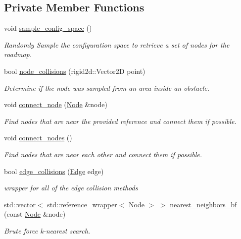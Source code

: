 \subsection*{Private Member Functions}
\begin{DoxyCompactItemize}
\item 
\mbox{\label{classprm_1_1RoadMap_a0d91fcf77606b05494dfcae4a4945351}} 
void \hyperlink{classprm_1_1RoadMap_a0d91fcf77606b05494dfcae4a4945351}{sample\+\_\+config\+\_\+space} ()
\begin{DoxyCompactList}\small\item\em Randomly Sample the configuration space to retrieve a set of nodes for the roadmap. \end{DoxyCompactList}\item 
bool \hyperlink{classprm_1_1RoadMap_a73c24a16d78040b0d5f247f0cf181363}{node\+\_\+collisions} (rigid2d\+::\+Vector2D point)
\begin{DoxyCompactList}\small\item\em Determine if the node was sampled from an area inside an obstacle. \end{DoxyCompactList}\item 
void \hyperlink{classprm_1_1RoadMap_ad74dcd92a949ee573310790fa8b2cae1}{connect\+\_\+node} (\hyperlink{structprm_1_1Node}{Node} \&node)
\begin{DoxyCompactList}\small\item\em Find nodes that are near the provided reference and connect them if possible. \end{DoxyCompactList}\item 
\mbox{\label{classprm_1_1RoadMap_a05eba7fbe20463c8b8a3463dfd141c30}} 
void \hyperlink{classprm_1_1RoadMap_a05eba7fbe20463c8b8a3463dfd141c30}{connect\+\_\+nodes} ()
\begin{DoxyCompactList}\small\item\em Find nodes that are near each other and connect them if possible. \end{DoxyCompactList}\item 
bool \hyperlink{classprm_1_1RoadMap_a518085e457cb12dcbe63cfa3cc5942be}{edge\+\_\+collisions} (\hyperlink{structprm_1_1Edge}{Edge} edge)
\begin{DoxyCompactList}\small\item\em wrapper for all of the edge collision methods \end{DoxyCompactList}\item 
std\+::vector$<$ std\+::reference\+\_\+wrapper$<$ \hyperlink{structprm_1_1Node}{Node} $>$ $>$ \hyperlink{classprm_1_1RoadMap_a88e8d2df6c41bdc5ee5df4debbd0324d}{nearest\+\_\+neighbors\+\_\+bf} (const \hyperlink{structprm_1_1Node}{Node} \&node)
\begin{DoxyCompactList}\small\item\em Brute force k-\/nearest search. \end{DoxyCompactList}\end{DoxyCompactItemize}
